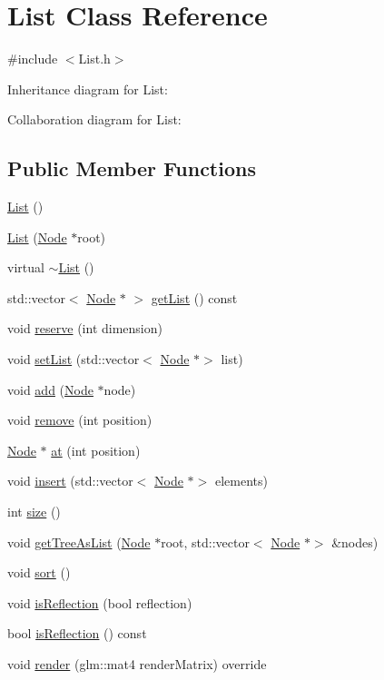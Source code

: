 \hypertarget{classList}{}\section{List Class Reference}
\label{classList}


{\ttfamily \#include $<$List.\+h$>$}



Inheritance diagram for List\+:


Collaboration diagram for List\+:
\subsection*{Public Member Functions}
\begin{DoxyCompactItemize}
\item 
\hyperlink{classList_a64d878a92d11f7c63c70cbe4e7dd4176}{List} ()
\item 
\hyperlink{classList_ac4bdd9fca5382f2b13316f54e56484d7}{List} (\hyperlink{classNode}{Node} $\ast$root)
\item 
virtual \hyperlink{classList_a70aecf37bd9d779a394e4d50377fbf5f}{$\sim$\+List} ()
\item 
std\+::vector$<$ \hyperlink{classNode}{Node} $\ast$ $>$ \hyperlink{classList_a2daf0ff93100ed732fc655f7e2af1ae9}{get\+List} () const
\item 
void \hyperlink{classList_ab0fd82314008a2da13ae096b3794def8}{reserve} (int dimension)
\item 
void \hyperlink{classList_ad37b253f0232820b8c13a1523e9f46b6}{set\+List} (std\+::vector$<$ \hyperlink{classNode}{Node} $\ast$$>$ list)
\item 
void \hyperlink{classList_ad5dc568900ee2069c7fcbf813aeeeead}{add} (\hyperlink{classNode}{Node} $\ast$node)
\item 
void \hyperlink{classList_a29511479f561a5840cdb2b913d9afd00}{remove} (int position)
\item 
\hyperlink{classNode}{Node} $\ast$ \hyperlink{classList_a7c79ecd4f068f6cde918941ad276e842}{at} (int position)
\item 
void \hyperlink{classList_adde6cc4002cdd88401634f383b4d3411}{insert} (std\+::vector$<$ \hyperlink{classNode}{Node} $\ast$$>$ elements)
\item 
int \hyperlink{classList_a86141be078d5fac15c1b7f402173a30f}{size} ()
\item 
void \hyperlink{classList_a613a58dfe61bbaebe346ef214c23b5cf}{get\+Tree\+As\+List} (\hyperlink{classNode}{Node} $\ast$root, std\+::vector$<$ \hyperlink{classNode}{Node} $\ast$$>$ \&nodes)
\item 
void \hyperlink{classList_a397e04de01f7a13691a7714a29e9b511}{sort} ()
\item 
void \hyperlink{classList_af9d3726a97cfa3355117f914db6c5ecc}{is\+Reflection} (bool reflection)
\item 
bool \hyperlink{classList_aa5924a5fcbb2907a0eebd04376db84a6}{is\+Reflection} () const
\item 
void \hyperlink{classList_a98b7c18a8ee26e9e521ab3b8f8bb4334}{render} (glm\+::mat4 render\+Matrix) override
\end{DoxyCompactItemize}
